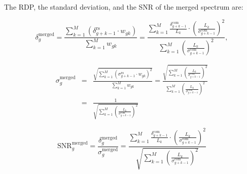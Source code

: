 

The RDP, the standard deviation, and the SNR of the merged spectrum are:

\begin{equation}
    \delta_{g}^\text{merged} = \frac{ \sum\limits_{k = 1}^{M}\left(\delta_{g+k-1}^\text{rs} \cdot {w_{gk}}\right)}{\sum\limits_{k = 1}^{M} {w_{gk}}} = \frac{\sum\limits_{k = 1}^{M}\frac{\delta_{g+k-1}^\text{com}}{L_{k}} \cdot \left(\frac{L_{k}}{\sigma_{g+k-1}^\text{com}}\right)^2} {\sum\limits_{k = 1}^{M}\left(\frac{L_{k}}{\sigma_{g+k-1}^\text{com}}\right)^2},
    \label{eq:merged_power}
\end{equation}

\begin{eqnarray}
  \sigma_{g}^\text{merged} & =  & \frac{ \sqrt{\sum\limits_{k = 1}^{M} \left(\sigma_{g+k-1}^\text{rs} \cdot {w_{gk}}\right)^2}}{\sum\limits_{k = 1}^{M} {w_{gk}}} = \frac{\sqrt{\sum\limits_{k = 1}^{M} \left(\frac{L_{k}}{\sigma_{g+k-1}^\text{com}}\right)^2}}{\sum\limits_{k = 1}^{M} \left(\frac{L_{k}}{\sigma_{g+k-1}^\text{com}}\right)^2}  \nonumber \\
    & = & \frac{1}{\sqrt{\sum\limits_{k = 1}^{M} \left(\frac{L_{k}}{\sigma_{g+k-1}^\text{com}}\right)^2}}
    \label{eq:merged_sigma}
\end{eqnarray}

\begin{equation}
    \label{eq:merged_snr}
    \text{SNR}_{g}^\text{merged} = \frac{\delta^\text{merged}_{g}}{\sigma^\text{merged}_{g}} = \frac{\sum\limits_{k = 1}^{M}\frac{\delta_{g+k-1}^\text{com}}{L_{k}} \cdot \left(\frac{L_{k}}{\sigma_{g+k-1}^\text{com}}\right)^2}{\sqrt{\sum\limits_{k = 1}^{M} \left(\frac{L_{k}}{\sigma_{g+k-1}^\text{com}}\right)^2}}
\end{equation}

